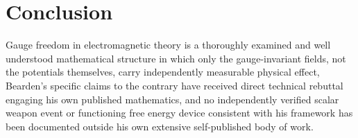 \documentclass[11pt]{article}
\begin{document}
\section{Conclusion}

Gauge freedom in electromagnetic theory is a thoroughly examined and well understood mathematical structure in which only the gauge-invariant fields, not the potentials themselves, carry independently measurable physical effect, Bearden's specific claims to the contrary have received direct technical rebuttal engaging his own published mathematics, and no independently verified scalar weapon event or functioning free energy device consistent with his framework has been documented outside his own extensive self-published body of work.
\end{document}
